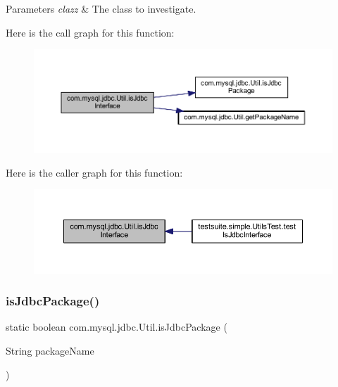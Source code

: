 \begin{DoxyParams}{Parameters}
{\em clazz} & The class to investigate. \\
\hline
\end{DoxyParams}
Here is the call graph for this function\+:
\nopagebreak
\begin{figure}[H]
\begin{center}
\leavevmode
\includegraphics[width=350pt]{classcom_1_1mysql_1_1jdbc_1_1_util_ad3d011a699b9fccde5f515f9fbd5b5f3_cgraph}
\end{center}
\end{figure}
Here is the caller graph for this function\+:
\nopagebreak
\begin{figure}[H]
\begin{center}
\leavevmode
\includegraphics[width=350pt]{classcom_1_1mysql_1_1jdbc_1_1_util_ad3d011a699b9fccde5f515f9fbd5b5f3_icgraph}
\end{center}
\end{figure}
\mbox{\label{classcom_1_1mysql_1_1jdbc_1_1_util_a9cb2ac4a8521a60214e3186ad634b3b3}} 
\subsubsection{\texorpdfstring{is\+Jdbc\+Package()}{isJdbcPackage()}}
{\footnotesize\ttfamily static boolean com.\+mysql.\+jdbc.\+Util.\+is\+Jdbc\+Package (\begin{DoxyParamCaption}\item[{String}]{package\+Name }\end{DoxyParamCaption})\hspace{0.3cm}{\ttfamily [static]}}

